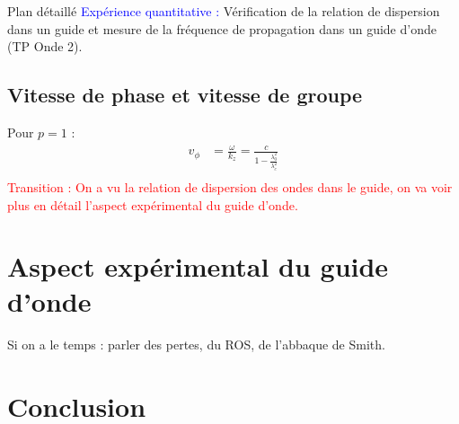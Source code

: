 \begin{reportBlock}{Plan détaillé}
  \textcolor{blue}{Expérience quantitative :} Vérification de la relation de dispersion dans un guide et mesure de la fréquence de propagation dans un guide d'onde (TP Onde 2).

  \subsection{Vitesse de phase et vitesse de groupe}
  Pour $p=1$ :
  \begin{align}
      v_{\phi} &= \frac{\omega}{k_z} = \frac{c}{1-\frac{\lambda_0^2}{\lambda_c^2}} \\
  \end{align}
  \textcolor{red}{Transition : On a vu la relation de dispersion des ondes dans le guide, on va voir plus en détail l'aspect expérimental du guide d'onde.}

  \section{Aspect expérimental du guide d'onde}
  Si on a le temps : parler des pertes, du ROS, de l'abbaque de Smith.
  
  \section*{Conclusion}

  

  
  

\end{reportBlock}